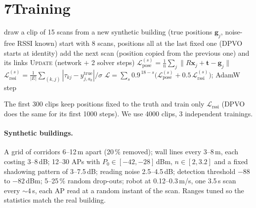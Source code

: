 \documentclass[11pt]{article}
\newcommand{\x}{\mathbf{x}}
\newcommand{\g}{\mathbf{g}}
\begin{document}
\section*{7\quad Training}
\begin{algorithm}[h]
\caption{One training step (as DPVO's \texttt{train.py})}
\begin{algorithmic}[1]
\State draw a clip of 15 scans from a new synthetic building (true positions $\g_j$, noise-free RSSI known)
\State start with 8 scans, positions all at the last fixed one (DPVO starts at identity)
   add the next scan (position copied from the previous one) and its links \EndIf
  \State \textsc{Update} (network $+$ 2 solver steps)
  \State $\mathcal{L}_{\text{pose}}^{(s)}=\frac1n\sum_j\lVert R\x_j+\mathbf{t}-\g_j\rVert$ 
  \State $\mathcal{L}_{\text{rssi}}^{(s)}=\frac{1}{|E|}\sum_{(k,j)}|\tau_{kj}-y^{\text{true}}_{j,a_k}|/\sigma$ 
\EndFor
\State $\mathcal{L}=\sum_s 0.9^{\,18-s}\big(\mathcal{L}_{\text{pose}}^{(s)}+0.5\,\mathcal{L}_{\text{rssi}}^{(s)}\big)$; AdamW step
\end{algorithmic}
\end{algorithm}
The first 300 clips keep positions fixed to the truth and train only $\mathcal{L}_{\text{rssi}}$
(DPVO does the same for its first 1000 steps). We use 4000 clips, 3 independent trainings.

\paragraph{Synthetic buildings.} A grid of corridors 6--12\,m apart (20\,\% removed); wall lines every
3--8\,m, each costing 3--8\,dB; 12--30 APs with $P_0\in[-42,-28]$\,dBm, $n\in[2,3.2]$ and a fixed
shadowing pattern of 3--7.5\,dB; reading noise 2.5--4.5\,dB; detection threshold $-88$ to $-82$\,dBm;
5--25\,\% random drop-outs; robot at 0.12--0.3\,m/s, one 3.5\,s scan every $\sim$4\,s, each AP read at
a random instant of the scan. Ranges tuned so the statistics match the real building.
\end{document}
